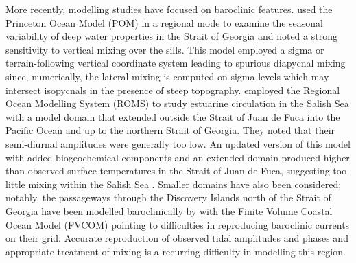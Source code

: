 \documentclass[letterpaper]{tATO2e}
\begin{document}
More recently, modelling studies have focused on baroclinic features. \citet{masson2004modelling} used the Princeton Ocean Model (POM) in a regional mode to examine the seasonal variability of deep water properties in the Strait of Georgia and noted a strong sensitivity to vertical mixing over the sills. This model employed a sigma or terrain-following vertical coordinate system leading to spurious diapycnal mixing since, numerically, the lateral mixing is computed on sigma levels which may intersect isopycnals in the presence of steep topography. 
\citet{sutherland2011model} employed the Regional Ocean Modelling System (ROMS) to study estuarine circulation in the Salish Sea with a model domain that extended outside the Strait of Juan de Fuca into the Pacific Ocean and up to the northern Strait of Georgia. They noted that their semi-diurnal amplitudes were generally too low. {\color{red} An updated version of this model with added biogeochemical components and an extended domain produced higher than observed surface temperatures in the Strait of Juan de Fuca, suggesting too little mixing within the Salish Sea \citep{giddings2014hindcasts}.} Smaller domains have also been considered; notably, the passageways through the Discovery Islands north of the Strait of Georgia have been modelled baroclinically by \citet{foreman2012circulation} with the Finite Volume Coastal Ocean Model (FVCOM) pointing to difficulties in reproducing baroclinic currents on their grid.  Accurate reproduction of observed tidal amplitudes and phases and appropriate treatment of mixing is a recurring difficulty in modelling this region.
\end{document}
